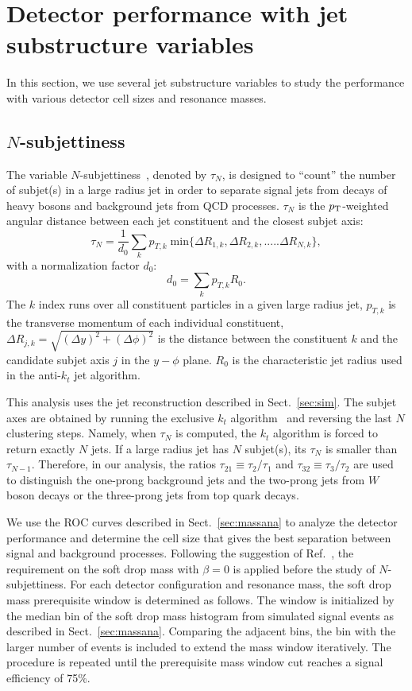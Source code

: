 \section{Detector performance with jet substructure variables}
In this section, we use several jet substructure variables to study the performance with various detector cell sizes and resonance masses.

\subsection{$N$-subjettiness \label{sec:nsub}}
The variable $N$-subjettiness~\cite{Thaler:2010tr}, denoted by $\tau_N$, is designed to 
``count'' the number of subjet(s) in a large radius jet in order to separate 
signal jets from decays of heavy bosons and background jets from QCD processes. 
 $\tau_N$ is the $p_{\mathrm{T}}$-weighted angular distance between each jet 
constituent and the closest subjet axis: 
\begin{equation}\label{eq:Nsub_1}
\tau_{N}=\frac{1}{d_{0}}\sum_{k}p_{T,k} \; \mathrm{min}\{\Delta R_{1,k},\Delta R_{2,k},.....\Delta R_{N,k}\},
\end{equation}
with a normalization factor $d_0$: \[d_{0}=\sum_{k}p_{T,k} R_{0}.\] 
The $k$ index runs over all constituent particles in a given large radius jet, 
$p_{T,k}$ is the transverse momentum of each individual constituent, 
$\Delta R_{j,k}=\sqrt{(\Delta y)^{2}+(\Delta \phi)^{2}}$ is the distance 
between the constituent $k$ and the candidate subjet axis $j$ in the 
$y-\phi$ plane. $R_{0}$ is the characteristic jet radius used in 
the anti-$k_t$ jet algorithm. 

This analysis uses the jet reconstruction described in Sect.~\ref{sec:sim}. 
The subjet axes are obtained by running the 
exclusive $k_{t}$ algorithm~\cite{Catani:246812} and reversing the last $N$ clustering steps. 
Namely, when $\tau_N$ is computed, the $k_{t}$ algorithm is forced to return 
exactly $N$ jets. If a large radius jet has $N$ subjet(s), its $\tau_{N}$ is 
smaller than $\tau_{N-1}$. Therefore, in our analysis, 
the ratios $\tau_{21} \equiv \tau_{2}/\tau_{1}$ and $\tau_{32} \equiv \tau_{3}/\tau_{2}$ 
are used to distinguish the one-prong background jets and 
the two-prong jets from $W$ boson decays or the three-prong jets from top quark decays. 

We use the ROC curves described in Sect.~\ref{sec:massana} to 
analyze the detector performance and determine the cell size that gives the 
best separation between signal and background processes. 
Following the suggestion of Ref.~\cite{Dreyer:2018tjj}, the requirement on the 
soft drop mass with $\beta=0$ is applied before the study of $N$-subjettiness. 
For each detector configuration and resonance mass, the soft drop mass prerequisite window  
is determined as follows. The window is initialized by the median bin of the soft drop 
mass histogram from simulated signal events as described in 
Sect.~\ref{sec:massana}. Comparing the adjacent bins, the bin with the larger number of events is included to extend the mass window iteratively. The procedure is 
repeated until the prerequisite mass window cut reaches a signal  efficiency of 75\%. 

